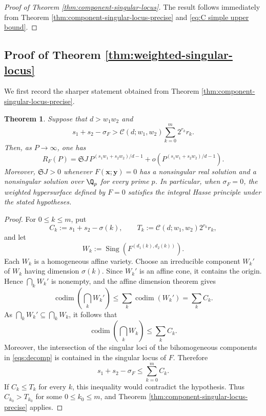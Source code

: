 \documentclass[12pt,reqno]{amsart}
\newtheorem{theorem}{Theorem}[section]
\theoremstyle{definition}
\theoremstyle{remark}
\numberwithin{equation}{section}
\newcommand{\codim}[1]{\operatorname{codim}\left(#1\right)}
\newcommand{\Sing}[1]{\operatorname{Sing}\left(#1\right)}
\def\bfx{{\mathbf x}}
\def\bfy{{\mathbf y}}
\begin{document}
\begin{proof}[Proof of Theorem \ref{thm:component-singular-locus}]
The result follows immediately from Theorem
\ref{thm:component-singular-locus-precise} and
\eqref{eq:C simple upper bound}.
\end{proof}

\subsection{Proof of Theorem \ref{thm:weighted-singular-locus}}
\label{sec:full singular locus reduction}

We first record the sharper statement obtained from Theorem
\ref{thm:component-singular-locus-precise}.

\begin{theorem}\label{thm:weighted-singular-locus-precise}
Suppose that $d>w_1w_2$ and
\[
    s_1+s_2-\sigma_F
    >
    \mathcal C(d;w_1,w_2)
    \sum_{k=0}^{m}2^{r_k}r_k.
\]
Then, as $P\to\infty$, one has
\[
    R_F(P)=\mathfrak S J\,P^{(s_1w_1+s_2w_2)/d-1}
    +o\left(P^{(s_1w_1+s_2w_2)/d-1}\right).
\]
Moreover, $\mathfrak S J>0$ whenever $F(\bfx;\bfy)=0$ has a nonsingular
real solution and a nonsingular solution over $\Q_p$ for every prime $p$.
In particular, when $\sigma_F=0$, the weighted hypersurface defined by
$F=0$ satisfies the integral Hasse principle under the stated hypotheses.
\end{theorem}

\begin{proof}
For $0\leq k\leq m$, put
\[
    C_k:=s_1+s_2-\sigma(k),
    \qquad
    T_k:=\mathcal C(d;w_1,w_2)2^{r_k}r_k,
\]
and let
\[
    W_k:=\Sing{F^{(d_1(k),d_2(k))}}.
\]
Each $W_k$ is a homogeneous affine variety. Choose an irreducible
component $W_k'$ of $W_k$ having dimension $\sigma(k)$. Since $W_k'$ is
an affine cone, it contains the origin. Hence $\bigcap_kW_k'$ is
nonempty, and the affine dimension theorem gives
\[
    \codim{\bigcap_kW_k'}
    \leq
    \sum_k\codim{W_k'}
    =\sum_kC_k.
\]
As $\bigcap_kW_k'\subseteq\bigcap_kW_k$, it follows that
\[
    \codim{\bigcap_kW_k}
    \leq\sum_kC_k.
\]
Moreover, the intersection of the singular loci of the bihomogeneous
components in \eqref{eqs:decomp} is contained in the singular locus of
$F$. Therefore
\[
    s_1+s_2-\sigma_F
    \leq\sum_{k=0}^{m}C_k.
\]
If $C_k\leq T_k$ for every $k$, this inequality would contradict the
hypothesis. Thus $C_{k_0}>T_{k_0}$ for some $0\leq k_0\leq m$, and
Theorem \ref{thm:component-singular-locus-precise} applies.
\end{proof}
\end{document}
